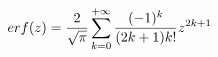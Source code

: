\documentclass[preview]{standalone}
\begin{document}
\begin{align*}
erf(z) = { \frac{2}{\sqrt{\pi}} } \sum_{k=0}^{+\infty} { { (-1)^k } \over { ( {2k+1} ) {k!} } } {z^{2k+1}}
\end{align*}
\end{document}
